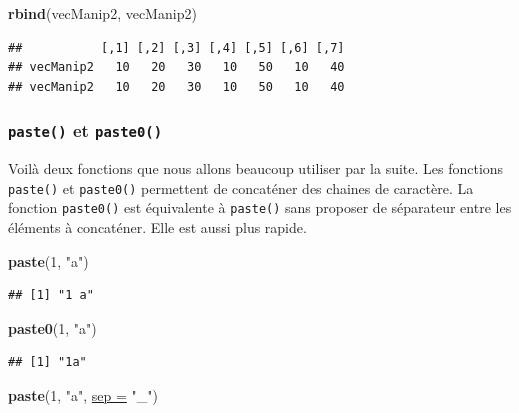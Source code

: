 \documentclass[twoside,symmetric]{book}
\newenvironment{Shaded}{}{}
\newcommand{\DataTypeTok}[1]{\underline{#1}}
\newcommand{\DecValTok}[1]{#1}
\newcommand{\KeywordTok}[1]{\textbf{#1}}
\newcommand{\NormalTok}[1]{#1}
\newcommand{\StringTok}[1]{#1}
\begin{document}
\begin{Shaded}
\begin{Highlighting}[]
\KeywordTok{rbind}\NormalTok{(vecManip2, vecManip2)}
\end{Highlighting}
\end{Shaded}

\begin{verbatim}
##           [,1] [,2] [,3] [,4] [,5] [,6] [,7]
## vecManip2   10   20   30   10   50   10   40
## vecManip2   10   20   30   10   50   10   40
\end{verbatim}

\hypertarget{l015paste}{%
\subsubsection{\texorpdfstring{\texttt{paste()} et \texttt{paste0()}}{paste() et paste0()}}\label{l015paste}}

Voilà deux fonctions que nous allons beaucoup utiliser par la suite. Les fonctions \texttt{paste()} et \texttt{paste0()} permettent de concaténer des chaines de caractère. La fonction \texttt{paste0()} est équivalente à \texttt{paste()} sans proposer de séparateur entre les éléments à concaténer. Elle est aussi plus rapide.

\begin{Shaded}
\begin{Highlighting}[]
\KeywordTok{paste}\NormalTok{(}\DecValTok{1}\NormalTok{, }\StringTok{"a"}\NormalTok{)}
\end{Highlighting}
\end{Shaded}

\begin{verbatim}
## [1] "1 a"
\end{verbatim}

\begin{Shaded}
\begin{Highlighting}[]
\KeywordTok{paste0}\NormalTok{(}\DecValTok{1}\NormalTok{, }\StringTok{"a"}\NormalTok{)}
\end{Highlighting}
\end{Shaded}

\begin{verbatim}
## [1] "1a"
\end{verbatim}

\begin{Shaded}
\begin{Highlighting}[]
\KeywordTok{paste}\NormalTok{(}\DecValTok{1}\NormalTok{, }\StringTok{"a"}\NormalTok{, }\DataTypeTok{sep =} \StringTok{"_"}\NormalTok{)}
\end{Highlighting}
\end{Shaded}
\end{document}
